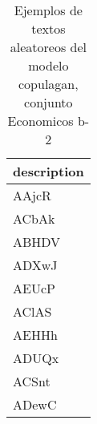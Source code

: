 \begin{table}[H]
\centering
\fontsize{8}{14}\selectfont
\caption{Ejemplos de textos aleatoreos del modelo copulagan, conjunto Economicos b-2}
\label{table-sample10-economicos-b-2-copulagan-text}
\begin{tabular}{|m{50em}|}
\hline
\rowcolor[gray]{0.8}
description \\
\hline AAjcR \\
\hline ACbAk \\
\hline ABHDV \\
\hline ADXwJ \\
\hline AEUcP \\
\hline AClAS \\
\hline AEHHh \\
\hline ADUQx \\
\hline ACSnt \\
\hline ADewC \\
\hline
\end{tabular}
\end{table}
